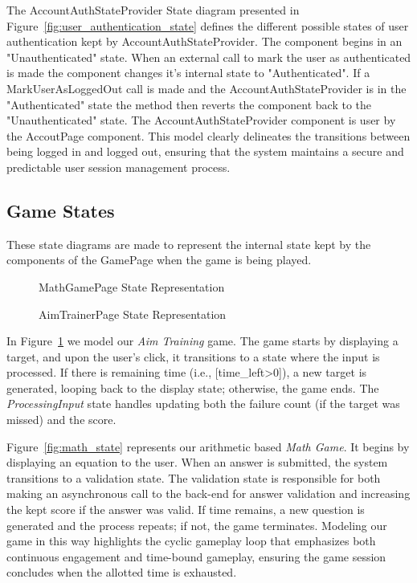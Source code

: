 \documentclass[11pt,a4paper]{article}
\newcommand{\inputdiagram}[1]{}
\newcommand{\textwidthdiagram}[2][1]{%
  \resizebox{#1\textwidth}{!}{\inputdiagram{#2}}%
}
\begin{document}
The AccountAuthStateProvider State diagram presented in
Figure~\ref{fig:user_authentication_state} defines the different possible
states of user authentication kept by AccountAuthStateProvider. The
component begins in an "Unauthenticated" state. When an external call
to mark the user as authenticated is made the component changes it's
internal state to "Authenticated". If a MarkUserAsLoggedOut call is made
and the AccountAuthStateProvider is in the "Authenticated" state the
method then reverts the component back to the "Unauthenticated" state. The
AccountAuthStateProvider component is user by the AccoutPage component. This
model clearly delineates the transitions between being logged in and logged
out, ensuring that the system maintains a secure and predictable user session
management process.

\subsection{Game States}

These state diagrams are made to represent the internal state kept by
the components of the GamePage when the game is being played.

\begin{figure}[H]
    \centering
    \begin{minipage}[b]{0.48\textwidth}
        \centering
        \textwidthdiagram{math_state.tex}
        \caption{MathGamePage State Representation}
        \label{fig:math_state}
    \end{minipage}
    \hfil
    \begin{minipage}[b]{0.48\textwidth}
        \centering
        \textwidthdiagram{aim_trainer_state.tex}
        \caption{AimTrainerPage State Representation}
        \label{fig:aim_trainer_state}
    \end{minipage}
\end{figure}

In Figure~\ref{fig:aim_trainer_state} we model our \textit{Aim Training} game. The
game starts by displaying a target, and upon the user's click, it transitions
to a state where the input is processed. If there is remaining time (i.e.,
[time\_left>0]), a new target is generated, looping back to the display state;
otherwise, the game ends. The \textit{ProcessingInput} state handles updating both
the failure count (if the target was missed) and the score.

Figure~\ref{fig:math_state} represents our arithmetic based \textit{Math Game}. It
begins by displaying an equation to the user. When an answer is submitted, the
system transitions to a validation state. The validation state is responsible
for both making an asynchronous call to the back-end for answer validation
and increasing the kept score if the answer was valid. If time remains,
a new question is generated and the process repeats; if not, the game
terminates. Modeling our game in this way highlights the cyclic gameplay
loop that emphasizes both continuous engagement and time-bound gameplay,
ensuring the game session concludes when the allotted time is exhausted.
\end{document}
